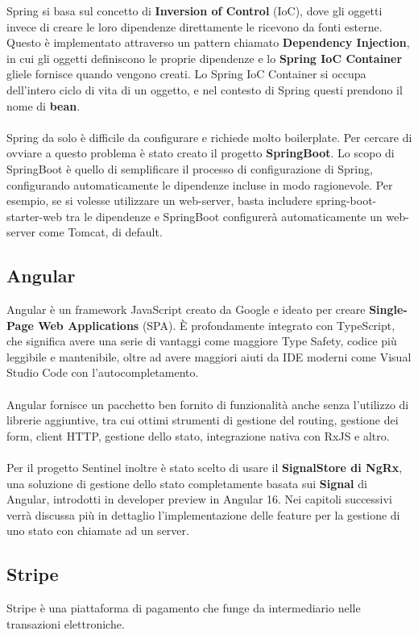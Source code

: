 Spring si basa sul concetto di \textbf{Inversion of Control} (IoC), dove gli oggetti invece di creare le loro dipendenze direttamente le ricevono da fonti esterne.
Questo \`e implementato attraverso un pattern chiamato \textbf{Dependency Injection}, in cui gli oggetti definiscono le proprie dipendenze e lo \textbf{Spring IoC Container}
gliele fornisce quando vengono creati.
Lo Spring IoC Container si occupa dell'intero ciclo di vita di un oggetto, e nel contesto di Spring questi prendono il nome di \textbf{bean}.
\\\\
Spring da solo \`e difficile da configurare e richiede molto boilerplate. Per cercare di ovviare a questo problema \`e stato creato il progetto \textbf{SpringBoot}.
Lo scopo di SpringBoot \`e quello di semplificare il processo di configurazione di Spring, configurando automaticamente le dipendenze incluse in modo ragionevole.
Per esempio, se si volesse utilizzare un web-server, basta includere spring-boot-starter-web tra le dipendenze e SpringBoot configurer\`a automaticamente un web-server come Tomcat, di default.
\subsection{Angular}
Angular è un framework JavaScript creato da Google e ideato per creare \textbf{Single-Page Web Applications} (SPA). È profondamente integrato con TypeScript,
che significa avere una serie di vantaggi come maggiore Type Safety, codice più leggibile e mantenibile, oltre ad avere maggiori aiuti da IDE moderni come Visual Studio Code
con l'autocompletamento.
\\\\
Angular fornisce un pacchetto ben fornito di funzionalità anche senza l'utilizzo di librerie aggiuntive, tra cui ottimi strumenti di gestione del
routing, gestione dei form, client HTTP, gestione dello stato, integrazione nativa con RxJS e altro.
\\\\
Per il progetto Sentinel inoltre è stato scelto di usare il \textbf{SignalStore di NgRx}, una soluzione di gestione dello stato completamente basata sui \textbf{Signal} di Angular,
introdotti in developer preview in Angular 16. Nei capitoli successivi verrà discussa più in dettaglio l'implementazione delle feature per la gestione di uno stato
con chiamate ad un server.
\subsection{Stripe}
Stripe \`e una piattaforma di pagamento che funge da intermediario nelle transazioni elettroniche.

